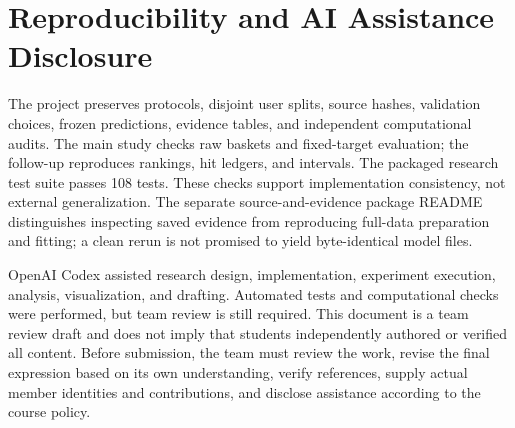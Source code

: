 \section*{Reproducibility and AI Assistance Disclosure}
The project preserves protocols, disjoint user splits, source hashes, validation choices, frozen predictions, evidence tables, and independent computational audits. The main study checks raw baskets and fixed-target evaluation; the follow-up reproduces rankings, hit ledgers, and intervals. The packaged research test suite passes 108 tests. These checks support implementation consistency, not external generalization. The separate source-and-evidence package README distinguishes inspecting saved evidence from reproducing full-data preparation and fitting; a clean rerun is not promised to yield byte-identical model files.

OpenAI Codex assisted research design, implementation, experiment execution, analysis, visualization, and drafting. Automated tests and computational checks were performed, but team review is still required. This document is a team review draft and does not imply that students independently authored or verified all content. Before submission, the team must review the work, revise the final expression based on its own understanding, verify references, supply actual member identities and contributions, and disclose assistance according to the course policy.
